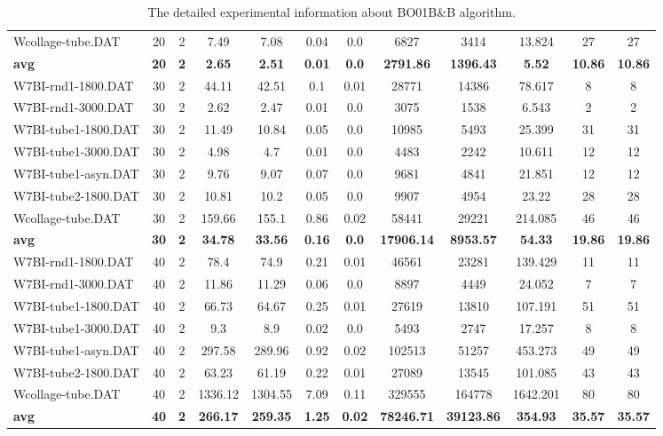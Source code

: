 \begin{table}[!h]
{\begin{tabular}{lccccccccccc}
Wcollage-tube.DAT & 20 & 2 & 7.49 & 7.08 & 0.04 & 0.0 & 6827 & 3414 & 13.824 & 27 & 27\\
\cline{1-12} \textbf{avg} & \textbf{20} & \textbf{2} & \textbf{2.65} & \textbf{2.51} & \textbf{0.01} & \textbf{0.0} & \textbf{2791.86} & \textbf{1396.43} & \textbf{5.52} & \textbf{10.86} & \textbf{10.86} \\ \cline{1-12}
W7BI-rnd1-1800.DAT & 30 & 2 & 44.11 & 42.51 & 0.1 & 0.01 & 28771 & 14386 & 78.617 & 8 & 8\\
W7BI-rnd1-3000.DAT & 30 & 2 & 2.62 & 2.47 & 0.01 & 0.0 & 3075 & 1538 & 6.543 & 2 & 2\\
W7BI-tube1-1800.DAT & 30 & 2 & 11.49 & 10.84 & 0.05 & 0.0 & 10985 & 5493 & 25.399 & 31 & 31\\
W7BI-tube1-3000.DAT & 30 & 2 & 4.98 & 4.7 & 0.01 & 0.0 & 4483 & 2242 & 10.611 & 12 & 12\\
W7BI-tube1-asyn.DAT & 30 & 2 & 9.76 & 9.07 & 0.07 & 0.0 & 9681 & 4841 & 21.851 & 12 & 12\\
W7BI-tube2-1800.DAT & 30 & 2 & 10.81 & 10.2 & 0.05 & 0.0 & 9907 & 4954 & 23.22 & 28 & 28\\
Wcollage-tube.DAT & 30 & 2 & 159.66 & 155.1 & 0.86 & 0.02 & 58441 & 29221 & 214.085 & 46 & 46\\
\cline{1-12} \textbf{avg} & \textbf{30} & \textbf{2} & \textbf{34.78} & \textbf{33.56} & \textbf{0.16} & \textbf{0.0} & \textbf{17906.14} & \textbf{8953.57} & \textbf{54.33} & \textbf{19.86} & \textbf{19.86} \\ \cline{1-12}
W7BI-rnd1-1800.DAT & 40 & 2 & 78.4 & 74.9 & 0.21 & 0.01 & 46561 & 23281 & 139.429 & 11 & 11\\
W7BI-rnd1-3000.DAT & 40 & 2 & 11.86 & 11.29 & 0.06 & 0.0 & 8897 & 4449 & 24.052 & 7 & 7\\
W7BI-tube1-1800.DAT & 40 & 2 & 66.73 & 64.67 & 0.25 & 0.01 & 27619 & 13810 & 107.191 & 51 & 51\\
W7BI-tube1-3000.DAT & 40 & 2 & 9.3 & 8.9 & 0.02 & 0.0 & 5493 & 2747 & 17.257 & 8 & 8\\
W7BI-tube1-asyn.DAT & 40 & 2 & 297.58 & 289.96 & 0.92 & 0.02 & 102513 & 51257 & 453.273 & 49 & 49\\
W7BI-tube2-1800.DAT & 40 & 2 & 63.23 & 61.19 & 0.22 & 0.01 & 27089 & 13545 & 101.085 & 43 & 43\\
Wcollage-tube.DAT & 40 & 2 & 1336.12 & 1304.55 & 7.09 & 0.11 & 329555 & 164778 & 1642.201 & 80 & 80\\
\cline{1-12} \textbf{avg} & \textbf{40} & \textbf{2} & \textbf{266.17} & \textbf{259.35} & \textbf{1.25} & \textbf{0.02} & \textbf{78246.71} & \textbf{39123.86} & \textbf{354.93} & \textbf{35.57} & \textbf{35.57} \\ \cline{1-12}
\bottomrule
\end{tabular}%
}%
\caption{The detailed experimental information about BO01B\&B algorithm.}
\label{tab:table_bb}
\end{table}

